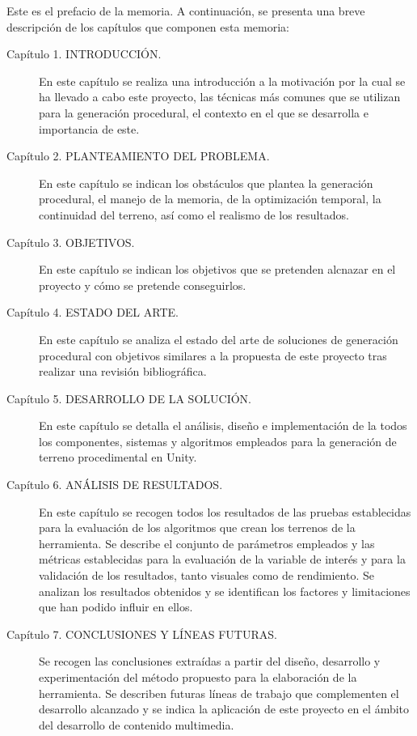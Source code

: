 Este es el prefacio de la memoria. A continuación, se presenta una breve descripción de los capítulos que componen esta memoria:

\begin{description}
  \item[Capítulo 1. INTRODUCCIÓN.] En este capítulo se realiza una introducción a la motivación por la cual se ha llevado a cabo este proyecto, las técnicas más comunes que se utilizan para la generación procedural, el contexto en el que se desarrolla e importancia de este.

  \item[Capítulo 2. PLANTEAMIENTO DEL PROBLEMA.] En este capítulo se indican los obstáculos que plantea la generación procedural, el manejo de la memoria, de la optimización temporal, la continuidad del terreno, así como el realismo de los resultados.
  
  \item[Capítulo 3. OBJETIVOS.] En este capítulo se indican los objetivos que se pretenden alcnazar en el proyecto y cómo se pretende conseguirlos.

  \item[Capítulo 4. ESTADO DEL ARTE.] En este capítulo se analiza el estado del arte de soluciones de generación procedural con objetivos similares a la propuesta de este proyecto tras realizar una revisión bibliográfica.

  \item[Capítulo 5. DESARROLLO DE LA SOLUCIÓN.] En este capítulo se detalla el análisis, diseño e implementación de la todos los componentes, sistemas y algoritmos empleados para la generación de terreno procedimental en Unity.

  \item[Capítulo 6. ANÁLISIS DE RESULTADOS.] En este capítulo se recogen todos los resultados de las pruebas establecidas para la evaluación de los algoritmos que crean los terrenos de la herramienta. Se describe el conjunto de parámetros empleados y las métricas establecidas para la evaluación de la variable de interés y para la validación de los resultados, tanto visuales como de rendimiento. Se analizan los resultados obtenidos y se identifican los factores y limitaciones que han podido influir en ellos.

  \item[Capítulo 7. CONCLUSIONES Y LÍNEAS FUTURAS.] Se recogen las conclusiones extraídas a partir del diseño, desarrollo y experimentación del método propuesto para la elaboración de la herramienta. Se describen futuras líneas de trabajo que complementen el desarrollo alcanzado y se indica la aplicación de este proyecto en el ámbito del desarrollo de contenido multimedia.
\end{description}